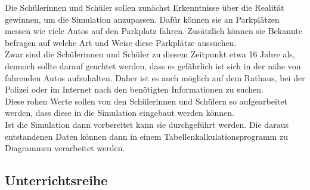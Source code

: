 Die Schülerinnen und Schüler sollen zunächst Erkenntnisse über die Realität gewinnen, um die Simulation anzupassen. Dafür können sie an Parkplätzen messen wie viele Autos auf den Parkplatz fahren. Zusätzlich können sie Bekannte befragen auf welche Art und Weise diese Parkplätze aussuchen.\\
Zwar sind die Schülerinnen und Schüler zu diesem Zeitpunkt etwa 16 Jahre als, dennoch sollte darauf geachtet werden, dass es gefährlich ist sich in der nähe von fahrenden Autos aufzuhalten. Daher ist es auch möglich auf dem Rathaus, bei der Polizei oder im Internet nach den benötigten Informationen zu suchen. \\
Diese rohen Werte sollen von den Schülerinnen und Schülern so aufgearbeitet werden, dass diese in die Simulation eingebaut werden können.\\
 Ist die Simulation dann vorbereitet kann sie durchgeführt werden. Die daraus entstandenen Daten können dann in einem Tabellenkalkulationsprogramm zu Diagrammen verarbeitet werden. 

\subsection{Unterrichtsreihe}